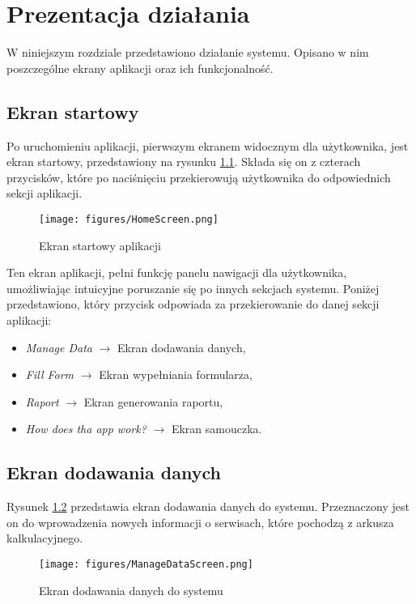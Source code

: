 \chapter{Prezentacja działania}

W niniejszym rozdziale przedstawiono działanie systemu. Opisano w nim poszczególne ekrany aplikacji oraz ich funkcjonalność. 

\section{Ekran startowy}
Po uruchomieniu aplikacji, pierwszym ekranem widocznym dla użytkownika, jest ekran startowy, przedstawiony na rysunku \ref{fig:homescreen}. Składa się on z czterach przycisków, które po naciśnięciu przekierowują użytkownika do odpowiednich sekcji aplikacji.

 \begin{figure}[h]
     \centering
     \texttt{[image: figures/HomeScreen.png]}
     \caption{Ekran startowy aplikacji} 
     \label{fig:homescreen}
 \end{figure}

 Ten ekran aplikacji, pełni funkcję panelu nawigacji dla użytkownika, umożliwiając intuicyjne poruszanie się po innych sekcjach systemu.
Poniżej przedstawiono, który przycisk odpowiada za przekierowanie do danej sekcji aplikacji:
\begin{itemize}
    \item \emph{Manage Data} $\rightarrow$ Ekran dodawania danych,
    \item \emph{Fill Form} $\rightarrow$ Ekran wypełniania formularza,
    \item \emph{Raport} $\rightarrow$ Ekran generowania raportu,
    \item \emph{How does tha app work?} $\rightarrow$ Ekran samouczka.
\end{itemize}


 \section{Ekran dodawania danych}
 Rysunek \ref{fig:managedatascreen} przedstawia ekran dodawania danych do systemu. Przeznaczony jest on do wprowadzenia nowych informacji o serwisach, które pochodzą z arkusza kalkulacyjnego.
  \begin{figure}[H]
     \centering
     \texttt{[image: figures/ManageDataScreen.png]}
     \caption{Ekran dodawania danych do systemu} 
     \label{fig:managedatascreen}
 \end{figure}

